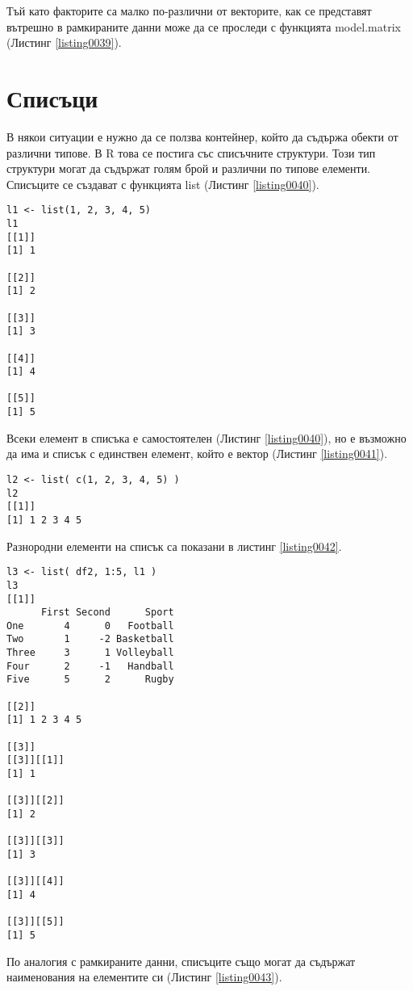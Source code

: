 Тъй като факторите са малко по-различни от векторите, как се представят вътрешно в рамкираните данни може да се проследи с функцията model.matrix (Листинг \ref{listing0039}).

\section{Списъци}

В някои ситуации е нужно да се ползва контейнер, който да съдържа обекти от различни типове. В R това се постига със списъчните структури. Този тип структури могат да съдържат голям брой и различни по типове елементи. Списъците се създават с функцията list (Листинг \ref{listing0040}).

\begin{lstlisting}[caption=Създаване на списък, label=listing0040]
l1 <- list(1, 2, 3, 4, 5)
l1
[[1]]
[1] 1

[[2]]
[1] 2

[[3]]
[1] 3

[[4]]
[1] 4

[[5]]
[1] 5
\end{lstlisting}

Всеки елемент в списъка е самостоятелен (Листинг \ref{listing0040}), но е възможно да има и списък с единствен елемент, който е вектор (Листинг \ref{listing0041}).

\begin{lstlisting}[caption=Вектор в списък, label=listing0041]
l2 <- list( c(1, 2, 3, 4, 5) )
l2
[[1]]
[1] 1 2 3 4 5
\end{lstlisting}

Разнородни елементи на списък са показани в листинг \ref{listing0042}.

\begin{lstlisting}[caption=Списък с разнородни данни, label=listing0042]
l3 <- list( df2, 1:5, l1 )
l3
[[1]]
      First Second      Sport
One       4      0   Football
Two       1     -2 Basketball
Three     3      1 Volleyball
Four      2     -1   Handball
Five      5      2      Rugby

[[2]]
[1] 1 2 3 4 5

[[3]]
[[3]][[1]]
[1] 1

[[3]][[2]]
[1] 2

[[3]][[3]]
[1] 3

[[3]][[4]]
[1] 4

[[3]][[5]]
[1] 5
\end{lstlisting}

По аналогия с рамкираните данни, списъците също могат да съдържат наименования на елементите си (Листинг \ref{listing0043}).

